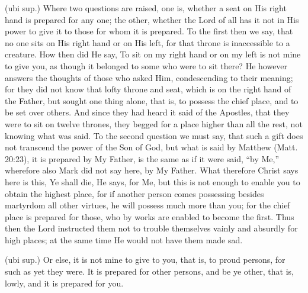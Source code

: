  (ubi sup.) Where two questions are raised, one is, whether a seat on His right hand is prepared for any one; the other, whether the Lord of all has it not in His power to give it to those for whom it is prepared. To the first then we say, that no one sits on His right hand or on His left, for that throne is inaccessible to a creature. How then did He say, To sit on my right hand or on my left is not mine to give you, as though it belonged to some who were to sit there? He however answers the thoughts of those who asked Him, condescending to their meaning; for they did not know that lofty throne and seat, which is on the right hand of the Father, but sought one thing alone, that is, to possess the chief place, and to be set over others. And since they had heard it said of the Apostles, that they were to sit on twelve thrones, they begged for a place higher than all the rest, not knowing what was said. To the second question we must say, that such a gift does not transcend the power of the Son of God, but what is said by Matthew (Matt. 20:23), it is prepared by My Father, is the same as if it were said, “by Me,” wherefore also Mark did not say here, by My Father. What therefore Christ says here is this, Ye shall die, He says, for Me, but this is not enough to enable you to obtain the highest place, for if another person comes possessing besides martyrdom all other virtues, he will possess much more than you; for the chief place is prepared for those, who by works are enabled to become the first. Thus then the Lord instructed them not to trouble themselves vainly and absurdly for high places; at the same time He would not have them made sad.

 (ubi sup.) Or else, it is not mine to give to you, that is, to proud persons, for such as yet they were. It is prepared for other persons, and be ye other, that is, lowly, and it is prepared for you.

 


